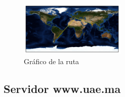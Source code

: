 \begin{figure}[H]
  \centering
    \includegraphics[width=0.45\textwidth]{grafico-rutas/invertisuniversity-ac-in.png}
  \caption{Gráfico de la ruta}
  \label{entropia-s}
\end{figure}




\subsection{Servidor www.uae.ma}


